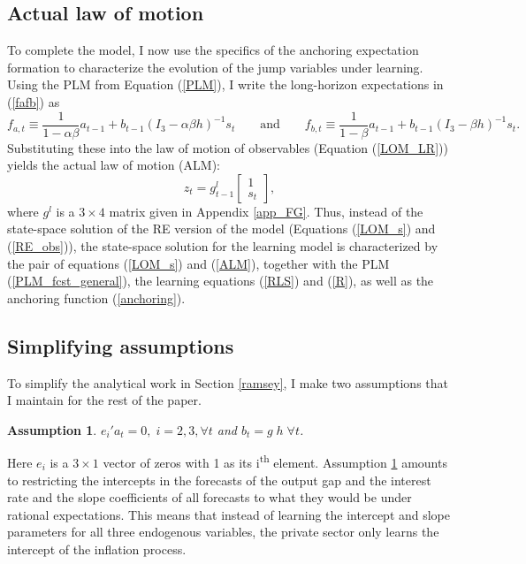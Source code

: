 \documentclass[11pt]{article}
\renewcommand{\[}{\begin{equation}}
\renewcommand{\]}{\end{equation}}
\newtheorem{ass}{Assumption}
\begin{document}
\subsection{Actual law of motion}
To complete the model, I now use the specifics of the anchoring expectation formation to characterize the evolution of the jump variables under learning. Using the PLM from Equation (\ref{PLM}), I write the long-horizon expectations in (\ref{fafb}) as
\begin{equation}
f_{a,t} \equiv \frac{1}{1-\alpha\beta}a_{t-1}  + b_{t-1}(I_3 - \alpha\beta h)^{-1}s_t \quad \quad \text{and} \quad \quad f_{b,t} \equiv \frac{1}{1-\beta}a_{t-1}  + b_{t-1}(I_3 - \beta h)^{-1}s_t  \label{fafb_anal}.
\end{equation}
Substituting these into the law of motion of observables (Equation (\ref{LOM_LR})) yields the actual law of motion (ALM):
\begin{equation}
z_t = g_{t-1}^l \begin{bmatrix} 1 \\ s_t
\end{bmatrix},
\label{ALM}
\end{equation}
where $g^l$ is a $3\times4$ matrix given in Appendix \ref{app_FG}. Thus, instead of the state-space solution of the RE version of the model (Equations (\ref{LOM_s}) and (\ref{RE_obs})), the state-space solution for the learning model is characterized by the pair of equations (\ref{LOM_s}) and (\ref{ALM}), together with the PLM (\ref{PLM_fcst_general}), the learning equations (\ref{RLS}) and (\ref{R}), as well as the anchoring function (\ref{anchoring}). 

\subsection{Simplifying assumptions}
To simplify the analytical work in Section \ref{ramsey}, I make two assumptions that I maintain for the rest of the paper.

\begin{ass}{$e_i' a_t = 0, \; i=2,3,\forall t$ and $b_t = g\; h \; \forall t$.}\label{ass_copo}
\end{ass}
Here $e_i$ is a $3\times1$ vector of zeros with 1 as its i\textsuperscript{th} element. Assumption \ref{ass_copo} amounts to restricting the intercepts in the forecasts of the output gap and the interest rate and the slope coefficients of all forecasts to what they would be under rational expectations.  This means that instead of learning the intercept and slope parameters for all three endogenous variables, the private sector only learns the intercept of the inflation process. 
\end{document}
